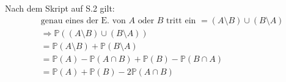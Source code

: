 \documentclass[10pt,a4paper,parskip=half]{scrartcl}
\newcommand{\PP}{\mathbb{P}}
\begin{document}
	Nach dem Skript auf S.2 gilt:
	\begin{align*}
		&\text{genau eines der E. von $A$ oder $B$ tritt ein } = ( A \setminus B) \cup (B \setminus A) \\
		&\Rightarrow \PP(( A \setminus B) \cup (B \setminus A)) \\
		&=\PP(A\setminus B) + \PP(B \setminus A) \\
		&= \PP(A) - \PP(A \cap B) + \PP(B) - \PP(B \cap A) \\
		&= \PP(A) + \PP(B) - 2\PP( A \cap B)
	\end{align*}
	
\end{document}
